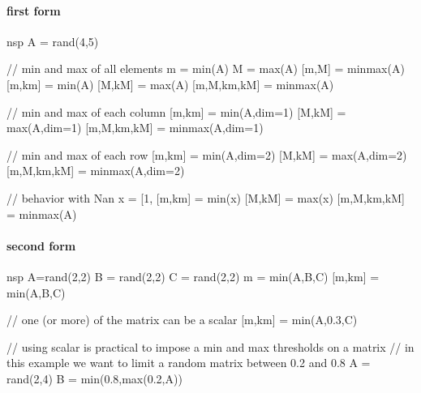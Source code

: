\begin{examples}
\paragraph{first form}
\begin{mintednsp}{nsp}
A = rand(4,5) 

// min and max of all elements
m = min(A) 
M = max(A) 
[m,M] = minmax(A)
[m,km] = min(A)
[M,kM] = max(A)
[m,M,km,kM] = minmax(A)

// min and max of each column
[m,km] = min(A,dim=1)
[M,kM] = max(A,dim=1)
[m,M,km,kM] = minmax(A,dim=1)

// min and max of each row
[m,km] = min(A,dim=2)
[M,kM] = max(A,dim=2)
[m,M,km,kM] = minmax(A,dim=2)

// behavior with Nan
x = [1, %
[m,km] = min(x)
[M,kM] = max(x)
[m,M,km,kM] = minmax(A)
\end{mintednsp}

\paragraph{second form}
\begin{mintednsp}{nsp}
A=rand(2,2) 
B = rand(2,2) 
C = rand(2,2) 
m = min(A,B,C) 
[m,km] = min(A,B,C) 

// one (or more) of the matrix can be a scalar 
[m,km] = min(A,0.3,C) 

// using scalar is practical to impose a min and max thresholds on a matrix 
// in this example we want to limit a random matrix between 0.2 and 0.8 
A = rand(2,4) 
B = min(0.8,max(0.2,A))
\end{mintednsp} 

\end{examples}

\begin{manseealso}
\end{manseealso}

